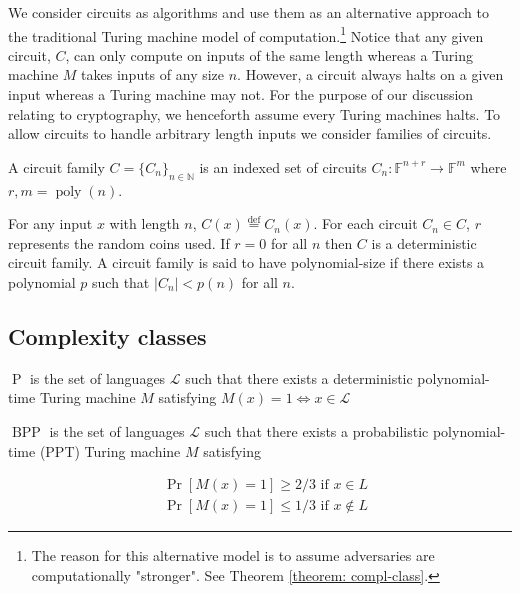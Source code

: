 We consider circuits as algorithms and use them as an alternative approach to the traditional Turing machine model of computation.\footnote{The reason for this alternative model is to assume adversaries are computationally "stronger". See Theorem \ref{theorem: compl-class}.} Notice that any given circuit, $C$, can only compute on inputs of the same length whereas a Turing machine $M$ takes inputs of any size $n$. However, a circuit always halts on a given input whereas a Turing machine may not. For the purpose of our discussion relating to cryptography, we henceforth assume every Turing machines halts. To allow circuits to handle arbitrary length inputs we consider families of circuits.  

\begin{definition}
A circuit family $C = \{C_n\}_{n \in \mathbb{N}}$ is an indexed set of circuits $C_n \colon \mathbb{F}^{n + r} \to \mathbb{F}^m$ where $r,m = \operatorname{poly}(n)$.
\end{definition}


For any input $x$ with length $n$, $C(x) \stackrel{\mathrm{def}}{=} C_n(x)$. For each circuit $C_n \in C$, $r$ represents the random coins used. If $r = 0$ for all $n$ then $C$ is a deterministic circuit family. A circuit family is said to have polynomial-size if there exists a polynomial $p$ such that $|C_n| < p(n)$ for all $n$. 

\subsection*{Complexity classes}\label{subsec:Complexity classes}

\begin{definition}
$\operatorname{P}$ is the set of languages $\mathscr{L}$ such that there exists a deterministic polynomial-time Turing machine $M$ satisfying $M(x) = 1 \iff x \in \mathscr{L}$ 
\end{definition}

\begin{definition}
$\operatorname{BPP}$ is the set of languages $\mathscr{L}$ such that there exists a probabilistic polynomial-time (PPT) Turing machine $M$ satisfying


\begin{align*}
& \operatorname{Pr}[M(x)=1] \geq 2/3 \text{ if $x \in L$}
\\
& \operatorname{Pr}[M(x)=1] \leq 1/3 \text{ if $x \notin L$}
\end{align*}
\end{definition}

